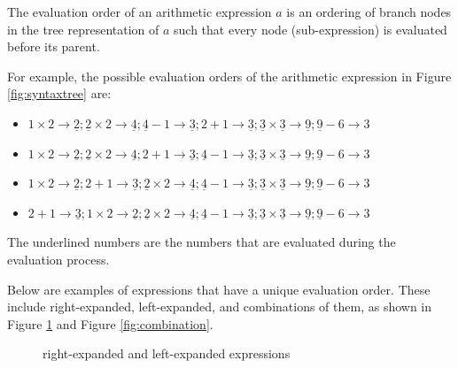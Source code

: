 \begin{definition}
The evaluation order of an arithmetic expression $a$ is an ordering of branch nodes in the tree representation of $a$
such that every node (sub-expression) is evaluated before its parent.
\end{definition}

For example, the possible evaluation orders of the arithmetic expression in Figure \ref{fig:syntaxtree} are:
\begin{itemize}
  \item $1 \times 2 \rightarrow \underline{2}; \underline{2} \times 2 \rightarrow \underline{4}; \underline{4} - 1 \rightarrow \underline{3}; 2 + 1 \rightarrow \underline{3}; \underline{3} \times \underline{3} \rightarrow \underline{9}; \underline{9} - 6 \rightarrow 3$
  \item $1 \times 2 \rightarrow \underline{2}; \underline{2} \times 2 \rightarrow \underline{4}; 2 + 1 \rightarrow \underline{3}; \underline{4} - 1 \rightarrow \underline{3}; \underline{3} \times \underline{3} \rightarrow \underline{9}; \underline{9} - 6 \rightarrow 3$
  \item $1 \times 2 \rightarrow \underline{2}; 2 + 1 \rightarrow \underline{3}; \underline{2} \times 2 \rightarrow \underline{4}; \underline{4} - 1 \rightarrow \underline{3}; \underline{3} \times \underline{3} \rightarrow \underline{9}; \underline{9} - 6 \rightarrow 3$
  \item $2 + 1 \rightarrow \underline{3}; 1 \times 2 \rightarrow \underline{2}; \underline{2} \times 2 \rightarrow \underline{4}; \underline{4} - 1 \rightarrow \underline{3}; \underline{3} \times \underline{3} \rightarrow \underline{9}; \underline{9} - 6 \rightarrow 3$
\end{itemize}

The underlined numbers are the numbers that are evaluated during the evaluation process.

Below are examples of expressions that have a unique evaluation order. These include right-expanded, left-expanded,
and combinations of them, as shown in Figure \ref{fig:leftright} and Figure \ref{fig:combination}.

\begin{figure}[ht]
\centering
{}
\caption{right-expanded and left-expanded expressions}\label{fig:leftright}
\end{figure}

